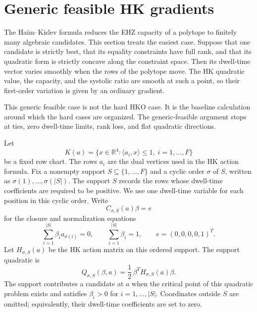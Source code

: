 
\section{Generic feasible HK gradients}
\label{sec:sys-first-order-generic-feasible}

\begin{unverified}
The Haim--Kislev formula reduces the EHZ capacity of a polytope to finitely
many algebraic candidates. This section treats the easiest case. Suppose that
one candidate is strictly best, that its equality constraints have full rank,
and that its quadratic form is strictly concave along the constraint space.
Then its dwell-time vector varies smoothly when the rows of the polytope move.
The HK quadratic value, the capacity, and the systolic ratio are smooth at such
a point, so their first-order variation is given by an ordinary gradient.

This generic feasible case is not the hard HKO case. It is the baseline
calculation around which the hard cases are organized. The generic-feasible
argument stops at ties, zero dwell-time limits, rank loss, and flat quadratic
directions.

Let
\[
  K(a) = \{x \in \mathbb{R}^4 : \langle a_i,x\rangle \leq 1,\;
    i=1,\ldots,F\}
\]
be a fixed row chart. The rows \(a_i\) are the dual vertices used in the HK
action formula. Fix a nonempty support \(S\subseteq \{1,\ldots,F\}\) and a
cyclic order \(\sigma\) of \(S\), written as
\(\sigma(1),\ldots,\sigma(|S|)\). The support \(S\) records the rows whose
dwell-time coefficients are required to be positive. We use one dwell-time
variable for each position in this cyclic order. Write
\[
  C_{\sigma,S}(a)\beta = e
\]
for the closure and normalization equations
\[
  \sum_{i=1}^{|S|}\beta_i a_{\sigma(i)} = 0,
  \qquad
  \sum_{i=1}^{|S|}\beta_i = 1,
  \qquad
  e=(0,0,0,0,1)^T .
\]
Let \(H_{\sigma,S}(a)\) be the HK action matrix on this ordered support. The
support quadratic is
\[
  Q_{\sigma,S}(\beta,a)
    = \frac12\,\beta^T H_{\sigma,S}(a)\beta .
\]
The support contributes a candidate at \(a\) when the critical point of this
quadratic problem exists and satisfies \(\beta_i>0\) for
\(i=1,\ldots,|S|\).
Coordinates outside \(S\) are omitted; equivalently, their dwell-time
coefficients are set to zero.


\end{unverified}
